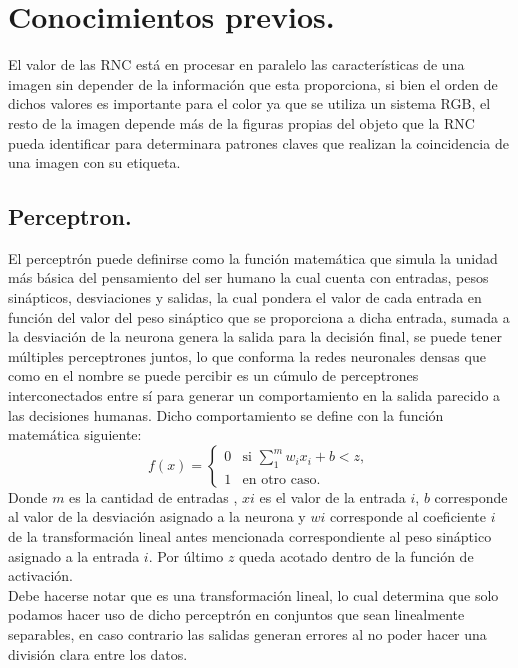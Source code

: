 \documentclass[a4paper, 12pt]{article}
\begin{document}
    \section{Conocimientos previos.}
    El valor de las RNC está en procesar en paralelo las características de una imagen sin depender de la información que esta proporciona, si bien el orden de dichos valores es importante para el color ya que se utiliza un sistema RGB, el resto de la imagen depende más de la figuras propias del objeto que la RNC pueda identificar para determinara patrones claves que realizan la coincidencia de una imagen con su etiqueta.

    \subsection{Perceptron.}
    El perceptrón puede definirse como la función matemática que simula la unidad más básica del pensamiento del ser humano la cual cuenta con entradas, pesos sinápticos, desviaciones y salidas, la cual pondera el valor de cada entrada en función del valor del peso sináptico que se proporciona a dicha entrada, sumada a la desviación de la neurona genera la salida para la decisión final, se puede tener múltiples perceptrones juntos, lo que conforma la redes neuronales densas que como en el nombre se puede percibir es un cúmulo de perceptrones interconectados entre sí para generar un comportamiento en la salida parecido a las decisiones humanas. Dicho comportamiento se define con la función matemática siguiente:
    \[
    f(x) =
    \begin{cases}
        0 & \text{si } \sum\limits_{1}^{m} w_i x_i + b < z, \\
        1 & \text{en otro caso}.
    \end{cases}
    \]
    Donde $m$ es la cantidad de entradas , $xi$ es el valor de la entrada $i$, $b$ corresponde al valor de la desviación asignado a la neurona y $wi$ corresponde al coeficiente $i$ de la transformación lineal antes mencionada correspondiente al peso sináptico asignado a la entrada $i$. Por último $z$ queda acotado dentro de la función de activación.\\
    Debe hacerse notar que es una transformación lineal, lo cual determina que solo podamos hacer uso de dicho perceptrón en conjuntos que sean linealmente separables, en caso contrario las salidas generan errores al no poder hacer una división clara entre los datos.
\end{document}
